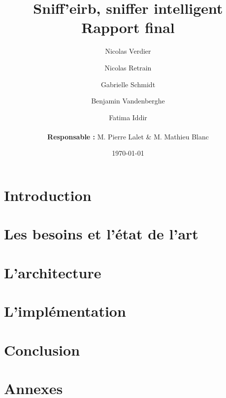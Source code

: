\documentclass[a4]{report}
\begin{document}
		
	\title{\Large{\textbf{Sniff'eirb, sniffer intelligent}}\\\Huge{\textbf{Rapport final}}}
	\author{
	Nicolas Verdier \and Nicolas Retrain \and Gabrielle Schmidt \and Benjamin Vandenberghe \and Fatima Iddir\\
	\\
	\textbf{Responsable : } M. Pierre Lalet \& M. Mathieu Blanc}
	\date{\today}
	
	\maketitle

	\tableofcontents{}
	\newpage
	
	\chapter*{Introduction}
		

	

		
	\chapter{Les besoins et l'état de l'art}
		
			
	\chapter{L'architecture}
		
		
	\chapter{L'implémentation}
		
	
						
	\chapter*{Conclusion}
		
	
	\chapter*{Annexes}
		
	
\end{document}
